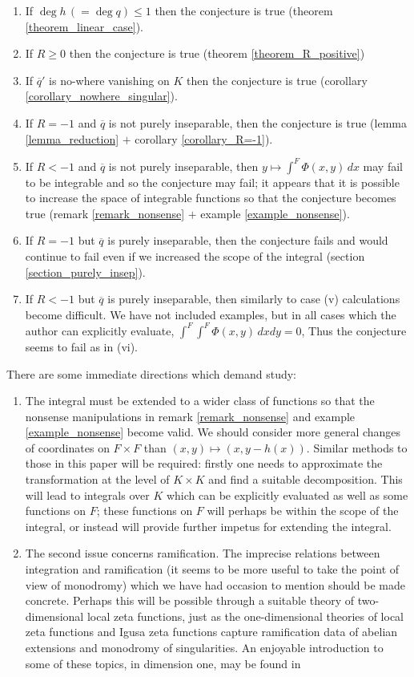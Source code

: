 \documentclass{lmsMODIFIED}
\newcommand{\res}[1]{\overline{#1}}
\begin{document}
\begin{enumerate}
\item If $\deg h\,(=\deg q)\le 1$ then the conjecture is true (theorem \ref{theorem_linear_case}).
\item If $R\ge 0$ then the conjecture is true (theorem \ref{theorem_R_positive})
\item If $\res{q}'$ is no-where vanishing on $ K $ then the conjecture is true (corollary \ref{corollary_nowhere_singular}).
\item If $R=-1$ and $\res{q}$ is not purely inseparable, then the conjecture is true (lemma \ref{lemma_reduction} $+$ corollary \ref{corollary_R=-1}).
\item If $R<-1$ and $\res{q}$ is not purely inseparable, then $y\mapsto\int^F\Phi(x,y)\,dx$ may fail to be integrable and so the conjecture may fail; it appears that it is possible to increase the space of integrable functions so that the conjecture becomes true (remark \ref{remark_nonsense} $+$ example \ref{example_nonsense}).
\item If $R=-1$ but $\res{q}$ is purely inseparable, then the conjecture fails and would continue to fail even if we increased the scope of the integral (section \ref{section_purely_insep}).
\item If $R<-1$ but $\res{q}$ is purely inseparable, then similarly to case (v) calculations become difficult. We have not included examples, but in all cases which the author can explicitly evaluate, $\int^F\int^F\Phi(x,y)\,dxdy=0$, Thus the conjecture seems to fail as in (vi).
\end{enumerate}

There are some immediate directions which demand study:

\begin{enumerate}
\item The integral must be extended to a wider class of functions so that the nonsense manipulations in remark \ref{remark_nonsense} and example \ref{example_nonsense} become valid. We should consider more general changes of coordinates on $F\times F$ than $(x,y)\mapsto (x,y-h(x))$. Similar methods to those in this paper will be required: firstly one needs to approximate the transformation at the level of $K\times K$ and find a suitable decomposition. This will lead to integrals over $K$ which can be explicitly evaluated as well as some functions on $F$; these functions on $F$ will perhaps be within the scope of the integral, or instead will provide further impetus for extending the integral.

\item The second issue concerns ramification. The imprecise relations between integration and ramification (it seems to be more useful to take the point of view of monodromy) which we have had occasion to mention should be made concrete. Perhaps this will be possible through a suitable theory of two-dimensional local zeta functions, just as the one-dimensional theories of local zeta functions and Igusa zeta functions capture ramification data of abelian extensions and monodromy of singularities. An enjoyable introduction to some of these topics, in dimension one, may be found in \cite{Nicaise2009}
\end{enumerate}
\end{document}
